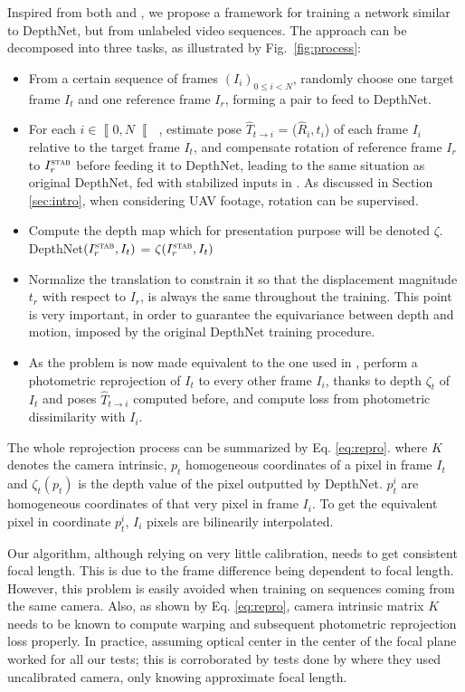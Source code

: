 \documentclass[runningheads]{llncs}
\begin{document}
Inspired from both \cite{zhou2017unsupervised} and \cite{isprs-annals-IV-2-W3-67-2017}, we propose a framework for training a network similar to DepthNet, but from unlabeled video sequences. The approach can be decomposed into three tasks, as illustrated by Fig.~\ref{fig:process}:
\begin{itemize}
\item From a certain sequence of frames $(I_i)_{0 \leq i < N}$, randomly choose one target frame $I_t$ and one reference frame
$I_r$, forming a pair to feed to DepthNet.
\item For each $i \in \left\llbracket 0,N \right\llbracket$ , estimate pose $\widehat{T}_{t\rightarrow i}$ = ($\widehat{R}_i, t_i$) of each frame $I_i$ relative to the target frame $I_t$, and compensate rotation of reference frame $I_r$ to $I^\textsc{stab}_r$ before feeding it to DepthNet, leading to the same situation as original DepthNet, fed with stabilized inputs in \cite{isprs-annals-IV-2-W3-67-2017}. As discussed in Section
\ref{sec:intro}, when considering UAV footage, rotation can be supervised.
\item Compute the depth map which for presentation purpose will be
denoted
$\zeta$. DepthNet$(I^\textsc{stab}_r, I_t)$ = $\zeta(I^\textsc{stab}_r, I_t)$
\item
Normalize the translation
to constrain it so that the displacement magnitude $t_r$ with respect to $I_r$, is always the same throughout the training. This point is very important,
in order to guarantee the
equivariance between depth and motion,
imposed by the original DepthNet training procedure.
\item As the problem is now made equivalent to the one used in \cite{zhou2017unsupervised}, perform a photometric reprojection of $I_t$ to every other frame $I_i$, thanks to depth $\zeta_t$ of $I_t$ and poses $\widehat{T}_{t \rightarrow i}$ computed before, and compute loss from photometric dissimilarity with $I_i$.
\end{itemize}

The whole reprojection process can be summarized by Eq. \ref{eq:repro}. where $K$ denotes the camera intrinsic, $p_t$ homogeneous coordinates of a pixel in frame $I_t$ and $\zeta_t(p_t)$ is the depth value of the pixel outputted by DepthNet. $p^i_t$ are homogeneous coordinates of that very pixel in frame $I_i$. To get the equivalent pixel in coordinate $p^i_t$,
$I_i$ pixels are bilinearily interpolated.

Our algorithm, although relying on very little calibration, needs to get consistent focal length. This is due to the frame difference being dependent to focal length. However, this problem is easily avoided when training on sequences coming from the same camera. Also, as shown by Eq. \ref{eq:repro}, camera
intrinsic matrix $K$ needs
to be known to compute warping and subsequent photometric reprojection loss properly. In practice, assuming optical center in the center of the focal plane worked for all our tests; this is corroborated by tests done by \cite{Mahjourian} where they used uncalibrated camera, only knowing approximate focal length.
\end{document}
